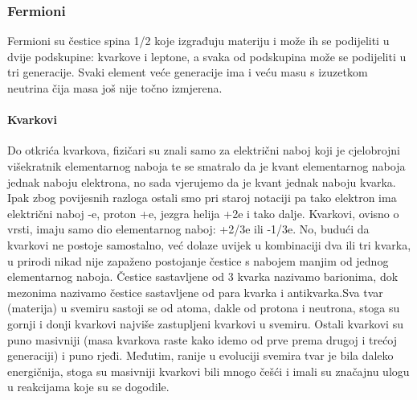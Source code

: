 \documentclass[12pt,a4paper,oneside]{article}
\begin{document}
\begin{linenumbers}
		
		\subsubsection{Fermioni}
		Fermioni su čestice spina 1/2 koje izgrađuju materiju i može ih se podijeliti u dvije podskupine: kvarkove i leptone, a svaka od podskupina  može se podijeliti u tri generacije. Svaki element veće generacije ima i veću masu s izuzetkom neutrina čija masa još nije točno izmjerena.
		\paragraph{Kvarkovi\newline}
		
		Do otkrića kvarkova, fizičari su znali samo za električni naboj koji je cjelobrojni višekratnik elementarnog naboja te se smatralo da je kvant elementarnog naboja jednak naboju elektrona, no sada vjerujemo da je kvant  jednak naboju kvarka. Ipak zbog povijesnih razloga ostali smo pri staroj notaciji pa tako elektron ima električni naboj -e, proton +e, jezgra helija +2e i tako dalje. Kvarkovi, ovisno o vrsti, imaju samo dio elementarnog naboj: +2/3e ili -1/3e. No, budući da kvarkovi ne postoje samostalno, već dolaze uvijek u kombinaciji dva ili tri kvarka, u prirodi nikad nije zapaženo postojanje čestice s nabojem manjim od jednog elementarnog naboja. Čestice sastavljene od 3 kvarka nazivamo barionima, dok mezonima nazivamo čestice sastavljene od para kvarka i antikvarka.Sva tvar (materija) u svemiru sastoji se od atoma, dakle od protona i neutrona, stoga su gornji i donji kvarkovi najviše zastupljeni kvarkovi u svemiru. Ostali kvarkovi su puno masivniji (masa kvarkova raste kako idemo od prve prema drugoj i trećoj generaciji) i puno rjeđi. Međutim, ranije u evoluciji svemira tvar je bila daleko energičnija, stoga su masivniji kvarkovi bili mnogo češći i imali su značajnu ulogu u reakcijama koje su se dogodile.
		

\end{linenumbers}
\end{document}
